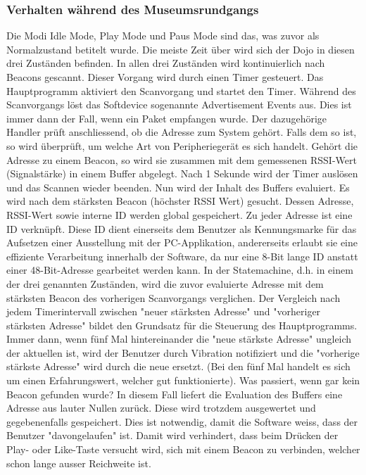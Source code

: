 \subsubsection{Verhalten während des Museumsrundgangs}
Die Modi Idle Mode, Play Mode und Paus Mode sind das, was zuvor als Normalzustand betitelt wurde. Die meiste Zeit über wird sich der Dojo in diesen drei Zuständen befinden.
In allen drei Zuständen wird kontinuierlich nach Beacons gescannt. Dieser Vorgang wird durch einen Timer gesteuert. Das Hauptprogramm aktiviert den Scanvorgang und startet den Timer. Während des Scanvorgangs löst das Softdevice sogenannte Advertisement Events aus. Dies ist immer dann der Fall, wenn ein Paket empfangen wurde. Der dazugehörige Handler prüft anschliessend, ob die Adresse zum System gehört. Falls dem so ist, so wird überprüft, um welche Art von Peripheriegerät es sich handelt. Gehört die Adresse zu einem Beacon, so wird sie zusammen mit dem gemessenen RSSI-Wert (Signalstärke) in einem Buffer abgelegt. Nach 1 Sekunde wird der Timer auslösen und das Scannen wieder beenden. Nun wird der Inhalt des Buffers evaluiert. Es wird nach dem stärksten Beacon (höchster RSSI Wert) gesucht. Dessen Adresse, RSSI-Wert sowie interne ID werden global gespeichert. Zu jeder Adresse ist eine ID verknüpft. Diese ID dient einerseits dem Benutzer als Kennungsmarke für das Aufsetzen einer Ausstellung mit der PC-Applikation, andererseits erlaubt sie eine effiziente Verarbeitung innerhalb der Software, da nur eine 8-Bit lange ID anstatt einer 48-Bit-Adresse gearbeitet werden kann.
In der Statemachine, d.h. in einem der drei genannten Zuständen, wird die zuvor evaluierte Adresse mit dem stärksten Beacon des vorherigen Scanvorgangs verglichen. Der Vergleich nach jedem Timerintervall zwischen "neuer stärksten Adresse" und "vorheriger stärksten Adresse" bildet den Grundsatz für die Steuerung des Hauptprogramms. Immer dann, wenn fünf Mal hintereinander die "neue stärkste Adresse" ungleich der aktuellen ist, wird der Benutzer durch Vibration notifiziert und die "vorherige stärkste Adresse" wird durch die neue ersetzt. (Bei den fünf Mal handelt es sich um einen Erfahrungswert, welcher gut funktionierte).
Was passiert, wenn gar kein Beacon gefunden wurde? In diesem Fall liefert die Evaluation des Buffers eine Adresse aus lauter Nullen zurück. Diese wird trotzdem ausgewertet und gegebenenfalls gespeichert. Dies ist notwendig, damit die Software weiss, dass der Benutzer "davongelaufen" ist. Damit wird verhindert, dass beim Drücken der Play- oder Like-Taste versucht wird, sich mit einem Beacon zu verbinden, welcher schon lange ausser Reichweite ist.
